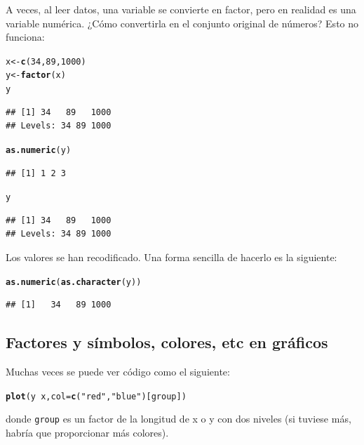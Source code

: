 \documentclass{config/apuntes}\usepackage[]{graphicx}\usepackage[]{xcolor}
\makeatletter
\newcommand{\hlnum}[1]{\textcolor[rgb]{0.686,0.059,0.569}{#1}}%
\newcommand{\hlsng}[1]{\textcolor[rgb]{0.192,0.494,0.8}{#1}}%
\newcommand{\hlopt}[1]{\textcolor[rgb]{0,0,0}{#1}}%
\newcommand{\hldef}[1]{\textcolor[rgb]{0.345,0.345,0.345}{#1}}%
\newcommand{\hlkwb}[1]{\textcolor[rgb]{0.69,0.353,0.396}{#1}}%
\newcommand{\hlkwc}[1]{\textcolor[rgb]{0.333,0.667,0.333}{#1}}%
\newcommand{\hlkwd}[1]{\textcolor[rgb]{0.737,0.353,0.396}{\textbf{#1}}}%
\newenvironment{kframe}{%
 \def\at@end@of@kframe{}%
 \ifinner\ifhmode%
  \def\at@end@of@kframe{\end{minipage}}%
  \begin{minipage}{\columnwidth}%
 \fi\fi%
 \def\FrameCommand##1{\hskip\@totalleftmargin \hskip-\fboxsep
 \colorbox{shadecolor}{##1}\hskip-\fboxsep
     \hskip-\linewidth \hskip-\@totalleftmargin \hskip\columnwidth}%
 \MakeFramed {\advance\hsize-\width
   \@totalleftmargin\z@ \linewidth\hsize
   \@setminipage}}%
 {\par\unskip\endMakeFramed%
 \at@end@of@kframe}
\newenvironment{knitrout}{}{} %
\newcommand{\code}[1]{\texttt{#1}}
\makeatother
\begin{document}
A veces, al leer datos, una variable se convierte en factor, pero en realidad es una variable numérica. ¿Cómo convertirla en el conjunto original de números? Esto no funciona:
\begin{knitrout}
\color{fgcolor}\begin{kframe}
\begin{alltt}
\hldef{x} \hlkwb{<-} \hlkwd{c}\hldef{(}\hlnum{34}\hldef{,} \hlnum{89}\hldef{,} \hlnum{1000}\hldef{)}
\hldef{y} \hlkwb{<-} \hlkwd{factor}\hldef{(x)}
\hldef{y}
\end{alltt}
\begin{verbatim}
## [1] 34   89   1000
## Levels: 34 89 1000
\end{verbatim}
\begin{alltt}
\hlkwd{as.numeric}\hldef{(y)}
\end{alltt}
\begin{verbatim}
## [1] 1 2 3
\end{verbatim}
\begin{alltt}
\hldef{y}
\end{alltt}
\begin{verbatim}
## [1] 34   89   1000
## Levels: 34 89 1000
\end{verbatim}
\end{kframe}
\end{knitrout}
Los valores se han recodificado. Una forma sencilla de hacerlo es la siguiente:
\begin{knitrout}
\color{fgcolor}\begin{kframe}
\begin{alltt}
\hlkwd{as.numeric}\hldef{(}\hlkwd{as.character}\hldef{(y))}
\end{alltt}
\begin{verbatim}
## [1]   34   89 1000
\end{verbatim}
\end{kframe}
\end{knitrout}

\subsection{Factores y símbolos, colores, etc en gráficos}
Muchas veces se puede ver código como el siguiente:
\begin{knitrout}
\color{fgcolor}\begin{kframe}
\begin{alltt}
\hlkwd{plot}\hldef{(y} \hlopt{~} \hldef{x,} \hlkwc{col} \hldef{=} \hlkwd{c}\hldef{(}\hlsng{"red"}\hldef{,} \hlsng{"blue"}\hldef{)[group])}
\end{alltt}
\end{kframe}
\end{knitrout}
donde \code{group} es un factor de la longitud de x o y con dos niveles (si tuviese más, habría que proporcionar más colores). 
\end{document}
